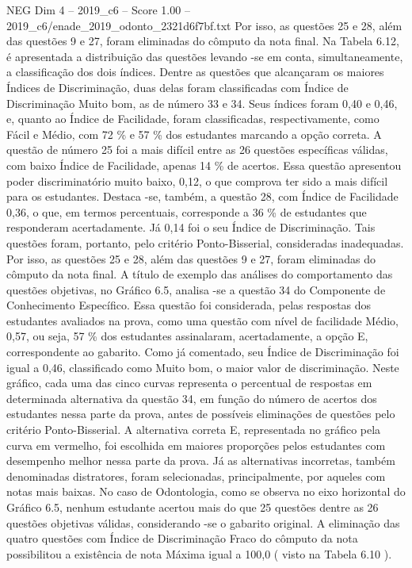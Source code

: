 \begin{textsample}{NEG Dim 4 – 2019\_c6 – Score 1.00 – 2019\_c6/enade\_2019\_odonto\_2321d6f7bf.txt}
Por isso, as questões 25 e 28, além das questões 9 e 27, foram eliminadas do cômputo da nota final.
Na Tabela 6.12, é apresentada a distribuição das questões levando -se em conta, simultaneamente, a classificação dos dois índices.
Dentre as questões que alcançaram os maiores Índices de Discriminação, duas delas foram classificadas com Índice de Discriminação Muito bom, as de número 33 e 34.
Seus índices foram 0,40 e 0,46, e, quanto ao Índice de Facilidade, foram classificadas, respectivamente, como Fácil e Médio, com 72 \% e 57 \% dos estudantes marcando a opção correta.
A questão de número 25 foi a mais difícil entre as 26 questões específicas válidas, com baixo Índice de Facilidade, apenas 14 \% de acertos.
Essa questão apresentou poder discriminatório muito baixo, 0,12, o que comprova ter sido a mais difícil para os estudantes.
Destaca -se, também, a questão 28, com Índice de Facilidade 0,36, o que, em termos percentuais, corresponde a 36 \% de estudantes que responderam acertadamente.
Já 0,14 foi o seu Índice de Discriminação.
Tais questões foram, portanto, pelo critério Ponto-Bisserial, consideradas inadequadas.
Por isso, as questões 25 e 28, além das questões 9 e 27, foram eliminadas do cômputo da nota final.
A título de exemplo das análises do comportamento das questões objetivas, no Gráfico 6.5, analisa -se a questão 34 do Componente de Conhecimento Específico.
Essa questão foi considerada, pelas respostas dos estudantes avaliados na prova, como uma questão com nível de facilidade Médio, 0,57, ou seja, 57 \% dos estudantes assinalaram, acertadamente, a opção E, correspondente ao gabarito.
Como já comentado, seu Índice de Discriminação foi igual a 0,46, classificado como Muito bom, o maior valor de discriminação.
Neste gráfico, cada uma das cinco curvas representa o percentual de respostas em determinada alternativa da questão 34, em função do número de acertos dos estudantes nessa parte da prova, antes de possíveis eliminações de questões pelo critério Ponto-Bisserial.
A alternativa correta E, representada no gráfico pela curva em vermelho, foi escolhida em maiores proporções pelos estudantes com desempenho melhor nessa parte da prova.
Já as alternativas incorretas, também denominadas distratores, foram selecionadas, principalmente, por aqueles com notas mais baixas.
No caso de Odontologia, como se observa no eixo horizontal do Gráfico 6.5, nenhum estudante acertou mais do que 25 questões dentre as 26 questões objetivas válidas, considerando -se o gabarito original.
A eliminação das quatro questões com Índice de Discriminação Fraco do cômputo da nota possibilitou a existência de nota Máxima igual a 100,0 ( visto na Tabela 6.10 ).

\end{textsample}
